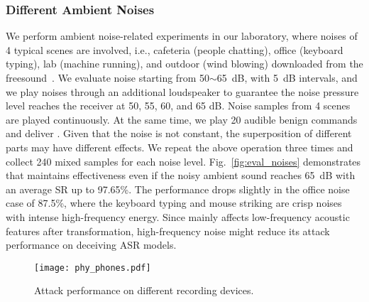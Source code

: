 \subsubsection{Different Ambient Noises}
We perform ambient noise-related experiments in our laboratory, where noises of 4 typical scenes are involved, i.e., cafeteria (people chatting), office (keyboard typing), lab (machine running), and outdoor (wind blowing) downloaded from the freesound~\cite{freesound}.
We evaluate noise starting from 50$\sim$65~dB, with 5~dB intervals, and we play noises through an additional loudspeaker to guarantee the noise pressure level reaches the receiver at 50, 55, 60, and 65 dB. Noise samples from 4 scenes are played continuously. At the same time, we play 20 audible benign commands and deliver \alias. Given that the noise is not constant, the superposition of different parts may have different effects. We repeat the above operation three times and collect 240 mixed samples for each noise level. Fig.~\ref{fig:eval_noises} demonstrates that \alias maintains effectiveness even if the noisy ambient sound reaches 65~dB with an average SR up to 97.65\%. The performance drops slightly in the office noise case of 87.5\%, where the keyboard typing and mouse striking are crisp noises with intense high-frequency energy. Since \alias mainly affects low-frequency acoustic features after transformation, high-frequency noise might reduce its attack performance on deceiving ASR models. 

\begin{figure}[t]
    \centering
    \texttt{[image: phy\_phones.pdf]}
    \caption{Attack performance on different recording devices.}
    \label{fig:phy_devices}
    \vspace{-10pt}
\end{figure}


